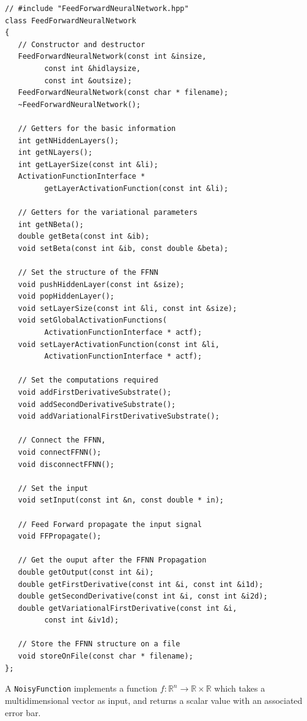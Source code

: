 \documentclass[11pt,a4paper,twoside]{article}
\begin{document}
\begin{verbatim}
// #include "FeedForwardNeuralNetwork.hpp"
class FeedForwardNeuralNetwork
{
   // Constructor and destructor
   FeedForwardNeuralNetwork(const int &insize,
         const int &hidlaysize, 
         const int &outsize);
   FeedForwardNeuralNetwork(const char * filename);
   ~FeedForwardNeuralNetwork();
   
   // Getters for the basic information
   int getNHiddenLayers();
   int getNLayers();
   int getLayerSize(const int &li);
   ActivationFunctionInterface * 
         getLayerActivationFunction(const int &li);
   
   // Getters for the variational parameters
   int getNBeta();
   double getBeta(const int &ib);
   void setBeta(const int &ib, const double &beta);
   
   // Set the structure of the FFNN
   void pushHiddenLayer(const int &size);
   void popHiddenLayer();
   void setLayerSize(const int &li, const int &size);
   void setGlobalActivationFunctions(
         ActivationFunctionInterface * actf);
   void setLayerActivationFunction(const int &li, 
         ActivationFunctionInterface * actf);
   
   // Set the computations required
   void addFirstDerivativeSubstrate();
   void addSecondDerivativeSubstrate();
   void addVariationalFirstDerivativeSubstrate();
   
   // Connect the FFNN, 
   void connectFFNN();
   void disconnectFFNN();
   
   // Set the input
   void setInput(const int &n, const double * in);
   
   // Feed Forward propagate the input signal
   void FFPropagate();
   
   // Get the ouput after the FFNN Propagation
   double getOutput(const int &i);
   double getFirstDerivative(const int &i, const int &i1d);
   double getSecondDerivative(const int &i, const int &i2d);
   double getVariationalFirstDerivative(const int &i, 
         const int &iv1d);
   
   // Store the FFNN structure on a file
   void storeOnFile(const char * filename);
};
\end{verbatim}

A \verb+NoisyFunction+ implements a function $f:\mathbb{R}^{n} \rightarrow \mathbb{R} \times \mathbb{R}$ which takes a multidimensional vector as input, and returns a scalar value with an associated error bar.
\end{document}
